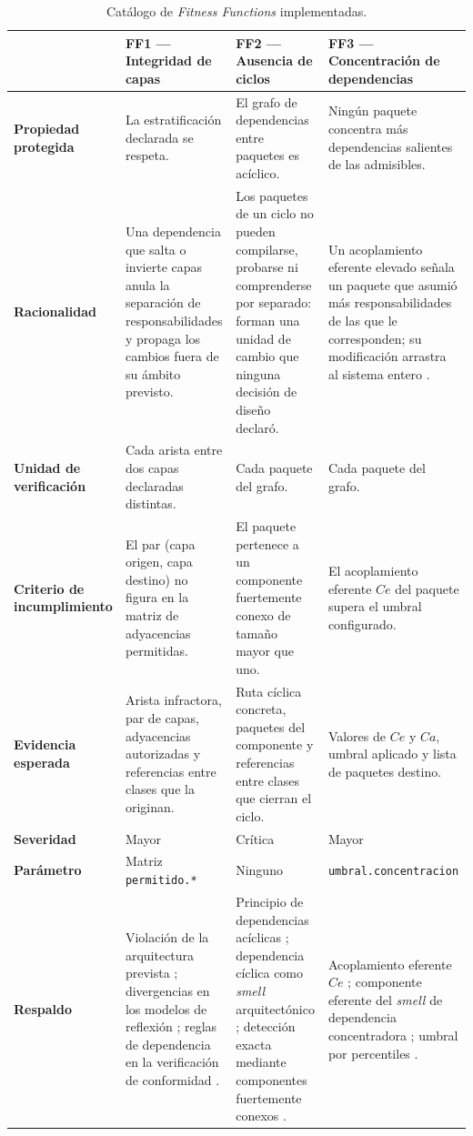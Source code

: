 \begin{table}[tbp]
\centering
\caption{Catálogo de \textit{Fitness Functions} implementadas.}
\label{tab:catalogo}
\footnotesize
\begin{tabularx}{\textwidth}{>{\raggedright\arraybackslash}p{2.4cm}>{\raggedright\arraybackslash}p{3.1cm}>{\raggedright\arraybackslash}X>{\raggedright\arraybackslash}X}
\toprule
& \textbf{FF1 — Integridad de capas} & \textbf{FF2 — Ausencia de ciclos} & \textbf{FF3 — Concentración de dependencias} \\
\midrule
\textbf{Propiedad protegida} &
La estratificación declarada se respeta. &
El grafo de dependencias entre paquetes es acíclico. &
Ningún paquete concentra más dependencias salientes de las admisibles. \\
\midrule
\textbf{Racionalidad} &
Una dependencia que salta o invierte capas anula la separación de responsabilidades y propaga los cambios fuera de su ámbito previsto. &
Los paquetes de un ciclo no pueden compilarse, probarse ni comprenderse por separado: forman una unidad de cambio que ninguna decisión de diseño declaró. &
Un acoplamiento eferente elevado señala un paquete que asumió más responsabilidades de las que le corresponden; su modificación arrastra al sistema entero \citep{Martin2003}. \\
\midrule
\textbf{Unidad de verificación} &
Cada arista entre dos capas declaradas distintas. &
Cada paquete del grafo. &
Cada paquete del grafo. \\
\midrule
\textbf{Criterio de incumplimiento} &
El par (capa origen, capa destino) no figura en la matriz de adyacencias permitidas. &
El paquete pertenece a un componente fuertemente conexo de tamaño mayor que uno. &
El acoplamiento eferente $Ce$ del paquete supera el umbral configurado. \\
\midrule
\textbf{Evidencia esperada} &
Arista infractora, par de capas, adyacencias autorizadas y referencias entre clases que la originan. &
Ruta cíclica concreta, paquetes del componente y referencias entre clases que cierran el ciclo. &
Valores de $Ce$ y $Ca$, umbral aplicado y lista de paquetes destino. \\
\midrule
\textbf{Severidad} & Mayor & Crítica & Mayor \\
\midrule
\textbf{Parámetro} & Matriz \texttt{permitido.*} & Ninguno & \texttt{umbral.concentracion} \\
\midrule
\textbf{Respaldo} &
Violación de la arquitectura prevista \citep{PerryWolf1992}; divergencias en los modelos de reflexión \citep{Murphy2001}; reglas de dependencia en la verificación de conformidad \citep{KnodelPopescu2007, DeSilva2012}. &
Principio de dependencias acíclicas \citep{Martin2003}; dependencia cíclica como \textit{smell} arquitectónico \citep{Sas2019}; detección exacta mediante componentes fuertemente conexos \citep{Tarjan1972}. &
Acoplamiento eferente $Ce$ \citep{Martin2003}; componente eferente del \textit{smell} de dependencia concentradora \citep{ArcelliFontana2016, Sas2019}; umbral por percentiles \citep{Alves2010}. \\
\bottomrule
\end{tabularx}
\end{table}

